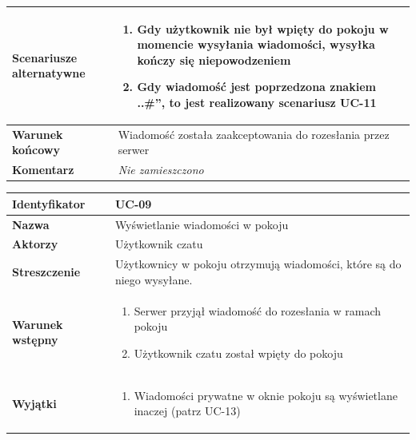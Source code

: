 \documentclass[11pt,oneside,a4paper,titlepage,onecolumn]{article}
\newenvironment{enumreq}
{ \begin{enumerate}[topsep=0pt,itemsep=-1ex,partopsep=1ex,parsep=1ex] }
{ \end{enumerate}                  }
\begin{document}
{\begin{tabular}{ | l | l | }
	\hline
		\parbox[t]{4cm}{\textbf{Scenariusze alternatywne}} & \parbox[t]
		{11cm}{
			\begin{enumreq}
				\item Gdy użytkownik nie był wpięty do pokoju w momencie
				wysyłania wiadomości, wysyłka kończy się niepowodzeniem
				\item Gdy wiadomość jest poprzedzona znakiem ..\#'', to
				jest realizowany scenariusz UC-11
			\end{enumreq}
		}
		\\
		
	\hline
		\parbox[t]{4cm}{\textbf{Warunek końcowy}} & \parbox[t]{11cm}{
			Wiadomość została zaakceptowania do rozesłania przez serwer
		}
		\\
		
	\hline
		\parbox[t]{4cm}{\textbf{Komentarz}} & \parbox[t]{11cm}{
			\textit{Nie zamieszczono}
		}
		\\

	\hline
\end{tabular}

\vspace{2em}

\begin{tabular}{ | l | l | }
	\hline
		\textbf{Identyfikator} & 
		UC-09
		\\
		
	\hline
		\textbf{Nazwa} & 
		Wyświetlanie wiadomości w pokoju
		\\
		
	\hline
		\textbf{Aktorzy} & \parbox[t]{11cm}{
			Użytkownik czatu
		}\\
		 
	\hline
		\parbox[t]{4cm}{\textbf{Streszczenie}} & \parbox[t]{11cm}{
			Użytkownicy w pokoju otrzymują wiadomości, które są do niego
			wysyłane.
			
		}\\
		
	\hline
		\parbox[t]{4cm}{\textbf{Warunek wstępny}} & \parbox[t]{11cm}{
			\begin{enumreq}
				\item Serwer przyjął wiadomość do rozesłania w ramach pokoju
				\item Użytkownik czatu został wpięty do pokoju
			\end{enumreq}
				
		}
		\\
		
	\hline
		\parbox[t]{4cm}{\textbf{Wyjątki}} & \parbox[t]{11cm}{
			\begin{enumreq}
				\item Wiadomości prywatne w oknie pokoju są wyświetlane
				inaczej (patrz UC-13)
			\end{enumreq}
			
}
\end{tabular}}
\end{document}
